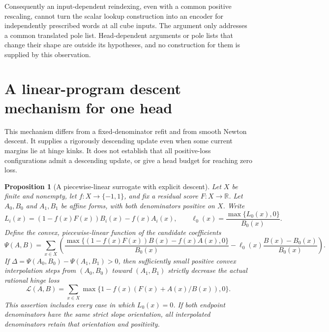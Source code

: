\documentclass[11pt]{article}
\newtheorem{proposition}{Proposition}
\begin{document}
Consequently an input-dependent reindexing, even with a common positive
rescaling, cannot turn the scalar lookup construction into an encoder
for independently prescribed words at all cube inputs. The argument
only addresses a common translated pole list. Head-dependent arguments
or pole lists that change their shape are outside its hypotheses, and
no construction for them is supplied by this observation.

\section{A linear-program descent mechanism for one head}

This mechanism differs from a fixed-denominator refit and from smooth
Newton descent. It supplies a rigorously descending update even when
some current margins lie at hinge kinks. It does not establish that all
positive-loss configurations admit a descending update, or give a head
budget for reaching zero loss.

\begin{proposition}[A piecewise-linear surrogate with explicit descent]
Let $X$ be finite and nonempty, let $f:X\to\{-1,1\}$, and fix a residual score
$F:X\to\mathbb R$. Let $A_0,B_0$ and $A_1,B_1$ be affine forms,
with both denominators positive on $X$. Write
\[
 L_i(x)=(1-f(x)F(x))B_i(x)-f(x)A_i(x),\qquad
 \ell_0(x)=\frac{\max\{L_0(x),0\}}{B_0(x)}.
\]
Define the convex, piecewise-linear function of the candidate coefficients
\[
 \Psi(A,B)=\sum_{x\in X}
 \left(\frac{\max\{(1-f(x)F(x))B(x)-f(x)A(x),0\}}{B_0(x)}
       -\ell_0(x)\frac{B(x)-B_0(x)}{B_0(x)}\right).
\]
If $\Delta=\Psi(A_0,B_0)-\Psi(A_1,B_1)>0$, then sufficiently small
positive convex interpolation steps from $(A_0,B_0)$ toward $(A_1,B_1)$
strictly decrease the actual rational hinge loss
\[
 \mathcal L(A,B)=\sum_{x\in X}\max\{1-f(x)(F(x)+A(x)/B(x)),0\}.
\]
This assertion includes every case in which $L_0(x)=0$.
If both endpoint denominators have the same strict slope orientation,
all interpolated denominators retain that orientation and positivity.
\end{proposition}
\end{document}
